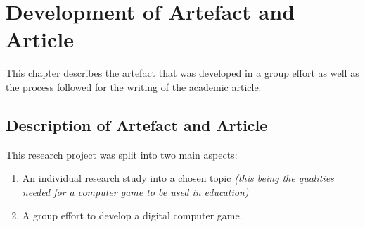 
\chapter{Development of Artefact and Article} %

\label{Chapter3} %

This chapter describes the artefact that was developed in a group effort as well as the process followed for the writing of the academic article.

\section{Description of Artefact and Article}
This research project was split into two main aspects: 
\begin{enumerate}
\item An individual research study into a chosen topic \textit{(this being the qualities needed for a computer game to be used in education)}
\item A group effort to develop a digital computer game.
\end{enumerate}

